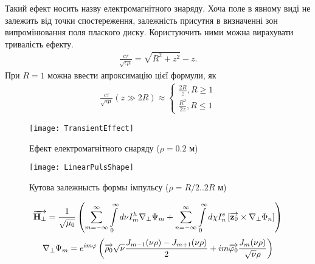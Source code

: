 %
Такий ефект носить назву електромагнітного знаряду. Хоча поле в явному
виді не залежить від точки спостереження, залежність присутня в визначенні 
зон випромінювання поля плаского диску. Користуючить ними можна вирахувати 
тривалість ефекту.
%
\begin{equation*} \begin{aligned}
\frac{c \tau}{\sqrt{\epsilon \mu}} = \sqrt{R^2+z^2} - z.
\end{aligned} \end{equation*}
%
При $ R = 1 $ можна ввести апроксимацію цієї формули, як  
%
\begin{equation*} \begin{aligned}
\frac{c \tau}{\sqrt{\epsilon \mu}} \left( z \gg 2R \right) \approx 
\begin{cases}
\frac{2R}{z} , R \geq 1 \\
\frac{R^2}{2z} , R \leq 1
\end{cases}
\end{aligned} \end{equation*}
%
\begin{figure}[h] \begin{center}
\texttt{[image: TransientEffect]}
\caption{Ефект електромагнітного снаряду ($ \rho = 0.2 $ м)} \label{fig:emp_z}
\end{center} \end{figure}
%
\begin{figure}[h] \begin{center}
\texttt{[image: LinearPulsShape]}
\caption{Кутова залежнысть формы імпульсу ($ \rho = R/2 .. 2R $ м)} 
\label{fig:emp_shape}
\end{center} \end{figure}
%
\textcolor{lightgray} { \begin{equation*} \begin{aligned}
\overrightarrow{\mathbf H_\perp} = \frac{1}{\sqrt{\mu_0}} \left( 
\sum \limits_{m=-\infty}^{\infty} \int \limits_{0}^{\infty} d \nu
I_m^h \nabla_\perp \Psi_m + \sum \limits_{n=-\infty}^{\infty}
\int \limits_{0}^{\infty} d \chi I_n^e 
\left[ \overrightarrow{\mathbf z_0} \times \nabla_\perp \Phi_n \right] \right)
\end{aligned} \end{equation*} }
%
\textcolor{lightgray} { \begin{equation*} \begin{aligned}
\nabla_\perp \Psi_m = e^{i m \varphi} \left( \overrightarrow{\mathbf \rho_0} 
\sqrt{\nu} \frac{ J_{m-1}(\nu \rho) - J_{m+1}(\nu \rho) }{2} +
i m \overrightarrow{\mathbf \varphi_0} \frac{J_m(\nu \rho)}{\sqrt{\nu} \rho} \right)
\end{aligned} \end{equation*} }

